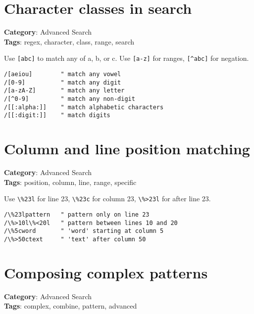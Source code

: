 \section{Character classes in search}

\textbf{Category}: Advanced Search\\ \textbf{Tags}: regex, character, class, range, search
\vspace{0.5cm}

Use {\footnotesize \Verb§[abc]§} to match any of a, b, or c. Use {\footnotesize \Verb§[a-z]§} for ranges, {\footnotesize \Verb§[^abc]§} for negation.

\begin{Exa*}{}
\begin{Verbatim}[fontsize=\footnotesize, breaklines, breakanywhere]
/[aeiou]        " match any vowel
/[0-9]          " match any digit
/[a-zA-Z]       " match any letter
/[^0-9]         " match any non-digit
/[[:alpha:]]    " match alphabetic characters
/[[:digit:]]    " match digits
\end{Verbatim}
\end{Exa*}

\section{Column and line position matching}

\textbf{Category}: Advanced Search\\ \textbf{Tags}: position, column, line, range, specific
\vspace{0.5cm}

Use {\footnotesize \Verb§\%23l§} for line 23, {\footnotesize \Verb§\%23c§} for column 23, {\footnotesize \Verb§\%>23l§} for after line 23.

\begin{Exa*}{}
\begin{Verbatim}[fontsize=\footnotesize, breaklines, breakanywhere]
/\%23lpattern   " pattern only on line 23
/\%>10l\%<20l   " pattern between lines 10 and 20
/\%5cword       " 'word' starting at column 5
/\%>50ctext     " 'text' after column 50
\end{Verbatim}
\end{Exa*}

\section{Composing complex patterns}

\textbf{Category}: Advanced Search\\ \textbf{Tags}: complex, combine, pattern, advanced
\vspace{0.5cm}


